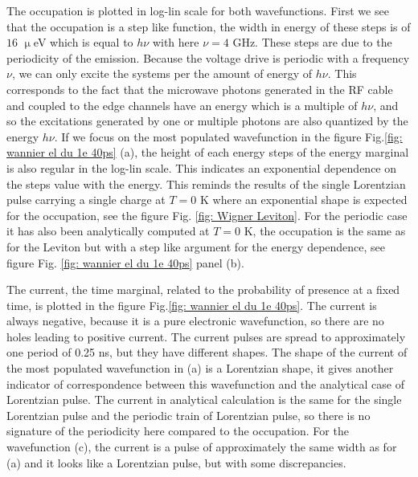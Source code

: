 The occupation is plotted in log-lin scale for both wavefunctions.
First we see that the occupation is a step like function, the width in energy of these steps is of $16$ $\upmu$eV which is equal to $h\nu$ with here $\nu = 4$ GHz. These steps are due to the periodicity of the emission.
Because the voltage drive is periodic with a frequency $\nu$, we can only excite the systems per the amount of energy of $h\nu$.
This corresponds to the fact that the microwave photons generated in the RF cable and coupled to the edge channels have an energy which is a multiple of $h\nu$, and so the excitations generated by one or multiple photons are also quantized by the energy $h\nu$.
If we focus on the most populated wavefunction in the figure Fig.\ref{fig: wannier el du 1e 40ps} (a), the height of each energy steps of the energy marginal is also regular in the log-lin scale.
This indicates an exponential dependence on the steps value with the energy.
This reminds the results of the single Lorentzian pulse carrying a single charge at $T = 0$ K where an exponential shape is expected for the occupation, see the figure Fig. \ref{fig: Wigner Leviton}.
For the periodic case it has also been analytically computed at $T = 0$ K, the occupation is the same as for the Leviton but with a step like argument for the energy dependence, see figure Fig. \ref{fig: wannier el du 1e 40ps} panel (b).

The current, the time marginal, related to the probability of presence at a fixed time, is plotted in the figure Fig.\ref{fig: wannier el du 1e 40ps}.
The current is always negative, because it is a pure electronic wavefunction, so there are no holes leading to positive current.
The current pulses are spread to approximately one period of 0.25 ns, but they have different shapes.
The shape of the current of the most populated wavefunction in (a) is a Lorentzian shape, it gives another indicator of correspondence between this wavefunction and the analytical case of Lorentzian pulse.
The current in analytical calculation is the same for the single Lorentzian pulse and the periodic train of Lorentzian pulse, so there is no signature of the periodicity here compared to the occupation.
For the wavefunction (c), the current is a pulse of approximately the same width as for (a) and it looks like a Lorentzian pulse, but with some discrepancies.

